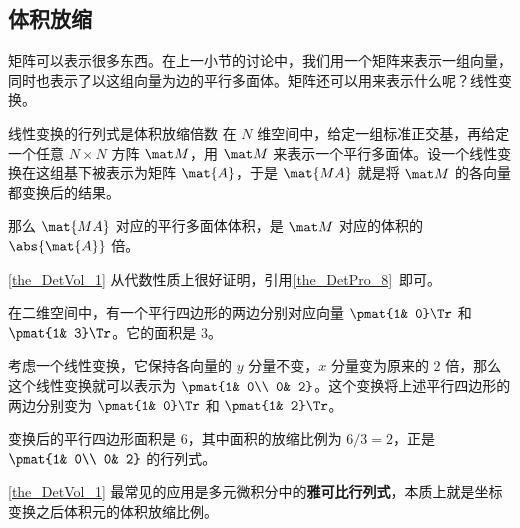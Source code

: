



\subsection{体积放缩}

矩阵可以表示很多东西。在上一小节的讨论中，我们用一个矩阵来表示一组向量，同时也表示了以这组向量为边的平行多面体。矩阵还可以用来表示什么呢？线性变换。

\begin{theorem}{线性变换的行列式是体积放缩倍数}\label{the_DetVol_1}
在 $N$ 维空间中，给定一组标准正交基，再给定一个任意 $N\times N$ 方阵 $\mat M$，用 $\mat M$ 来表示一个平行多面体。设一个线性变换在这组基下被表示为矩阵 $\mat{A}$，于是 $\mat{MA}$ 就是将 $\mat M$ 的各向量都变换后的结果。

那么 $\mat{MA}$ 对应的平行多面体体积，是 $\mat M$ 对应的体积的 $\abs{\mat{A}}$ 倍。
\end{theorem}

\autoref{the_DetVol_1} 从代数性质上很好证明，引用\autoref{the_DetPro_8}~即可。

\begin{example}{}
在二维空间中，有一个平行四边形的两边分别对应向量 $\pmat{1& 0}\Tr$ 和 $\pmat{1& 3}\Tr$。它的面积是 $3$。

考虑一个线性变换，它保持各向量的 $y$ 分量不变，$x$ 分量变为原来的 $2$ 倍，那么这个线性变换就可以表示为 $\pmat{1& 0\\ 0& 2}$。这个变换将上述平行四边形的两边分别变为 $\pmat{1& 0}\Tr$ 和 $\pmat{1& 2}\Tr$。

变换后的平行四边形面积是 $6$，其中面积的放缩比例为 $6/3=2$，正是 $\pmat{1& 0\\ 0& 2}$ 的行列式。
\end{example}

\autoref{the_DetVol_1} 最常见的应用是多元微积分中的\textbf{雅可比行列式}，本质上就是坐标变换之后体积元的体积放缩比例。



























